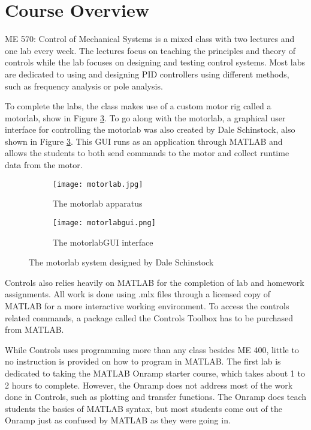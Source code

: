 \section{Course Overview}

ME 570: Control of Mechanical Systems is a mixed class with two lectures and one lab every week. The lectures focus on teaching
the principles and theory of controls while the lab focuses on designing and testing control systems. Most labs are dedicated to
using and designing PID controllers using different methods, such as frequency analysis or pole analysis.

To complete the labs, the class makes use of a custom motor rig called a motorlab, show in Figure \ref{fig:motorlab}. To go 
along with the motorlab, a graphical user interface for controlling the motorlab was also created by Dale Schinstock, also 
shown in Figure \ref{fig:motorlab}. This GUI runs as an application through MATLAB and allows the students to both send 
commands to the motor and collect runtime data from the motor.

\begin{figure}
    \centering
    \begin{subfigure}{.5\textwidth}
      \centering
      \texttt{[image: motorlab.jpg]}
      \caption{The motorlab apparatus}
      \label{fig:motorlab-device}
    \end{subfigure}%
    \begin{subfigure}{.5\textwidth}
      \centering
      \texttt{[image: motorlabgui.png]}
      \caption{The motorlabGUI interface}
      \label{fig:motorlabgui}
    \end{subfigure}
    \caption{The motorlab system designed by Dale Schinstock}
    \label{fig:motorlab}
\end{figure}

Controls also relies heavily on MATLAB for the completion of lab and homework assignments. All work is done using .mlx files through a 
licensed copy of MATLAB for a more interactive working environment. To access the controls related commands, a package called 
the Controls Toolbox has to be purchased from MATLAB. 

While Controls uses programming more than any class besides ME 400, little to no instruction is provided on how to program in MATLAB.
The first lab is dedicated to taking the MATLAB Onramp starter course, which takes about 1 to 2 hours to complete. However, the 
Onramp does not address most of the work done in Controls, such as plotting and transfer functions. The Onramp does teach students
the basics of MATLAB syntax, but most students come out of the Onramp just as confused by MATLAB as they were going in.

